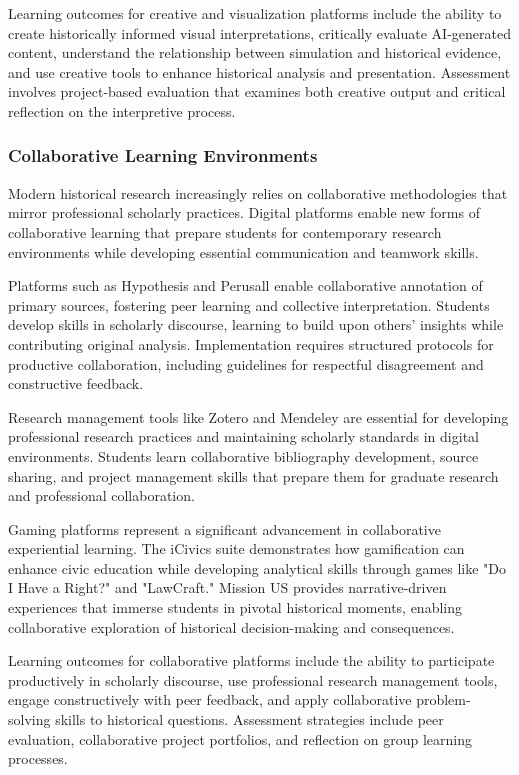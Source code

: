 Learning outcomes for creative and visualization platforms include the ability to create historically informed visual interpretations, critically evaluate AI-generated content, understand the relationship between simulation and historical evidence, and use creative tools to enhance historical analysis and presentation. Assessment involves project-based evaluation that examines both creative output and critical reflection on the interpretive process.

\subsubsection {Collaborative Learning Environments}

Modern historical research increasingly relies on collaborative methodologies that mirror professional scholarly practices. Digital platforms enable new forms of collaborative learning that prepare students for contemporary research environments while developing essential communication and teamwork skills.

Platforms such as Hypothesis and Perusall enable collaborative annotation of primary sources, fostering peer learning and collective interpretation. Students develop skills in scholarly discourse, learning to build upon others' insights while contributing original analysis. Implementation requires structured protocols for productive collaboration, including guidelines for respectful disagreement and constructive feedback.

Research management tools like Zotero and Mendeley are essential for developing professional research practices and maintaining scholarly standards in digital environments. Students learn collaborative bibliography development, source sharing, and project management skills that prepare them for graduate research and professional collaboration.

Gaming platforms represent a significant advancement in collaborative experiential learning. The iCivics suite demonstrates how gamification can enhance civic education while developing analytical skills through games like "Do I Have a Right?" and "LawCraft." Mission US provides narrative-driven experiences that immerse students in pivotal historical moments, enabling collaborative exploration of historical decision-making and consequences.

Learning outcomes for collaborative platforms include the ability to participate productively in scholarly discourse, use professional research management tools, engage constructively with peer feedback, and apply collaborative problem-solving skills to historical questions. Assessment strategies include peer evaluation, collaborative project portfolios, and reflection on group learning processes.

